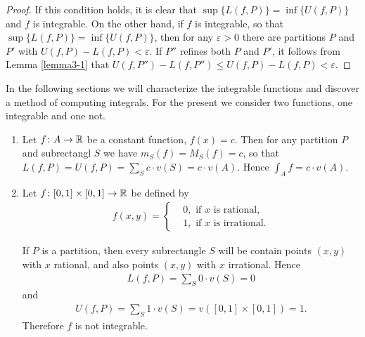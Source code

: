 \begin{proof}
    If this condition holds, it is clear that $\sup\{L(f,P)\} = \inf \{U(f, P)\}$ and 
    $f$ is integrable. On the other hand, if $f$ is integrable, so that $\sup\{L(f,P)\} = \inf \{U(f, P)\}$,
    then for any $\varepsilon>0$ there are partitions $P$ and $P'$ with $U(f, P)-L(f,P)<\varepsilon$. If 
    $P''$ refines both $P$ and $P'$, it follows from Lemma \ref{lemma3-1} that $U(f, P'')-L(f, P'')
    \le U(f, P)-L(f, P)<\varepsilon$.
\end{proof}

In the following sections we will characterize the integrable
functions and discover a method of computing integrals.
For the present we consider two functions, one integrable and one not.

\begin{enumerate}[label={\textup{\arabic*.\,}}]
  \item Let $f\colon{}A\to \mathbb{R}$ be a constant function, $f(x)=c$. Then for any partition
    $P$ and subrectangl $S$ we have $m_S(f) = M_S(f) = c$, so that $L(f, P) = U(f, P)
    = \sum_{S}^{}{c\cdot v(S)} = c\cdot v(A)$. Hence $\int_{A  }^{}{f} = c\cdot v(A)$.
  \item Let $f\colon{}[0, 1]\times [0, 1]\to \mathbb{R}$ be defined by 
    \begin{align*}
        f(x, y) =
        \left\{\begin{aligned}
            & 0, \text{ if $x$ is rational}, \\
            & 1, \text{ if $x$ is irrational}. 
        \end{aligned}\right.
    \end{align*}

    If $P$ is a partition, then every subrectangle $S$ will be contain points
    $(x, y)$ with $x$ rational, and also points $(x, y)$ with $x$ irrational.
    Hence 
    \begin{align*}
        L(f, P) = \sum_{S  }^{}{0\cdot v(S)} = 0
    \end{align*}
    and 
    \begin{align*}
        U(f, P) = \sum_{S  }^{}{1\cdot v(S)} = v([0, 1]\times [0, 1]) = 1.
    \end{align*}
    Therefore $f$ is not integrable. 
\end{enumerate}


